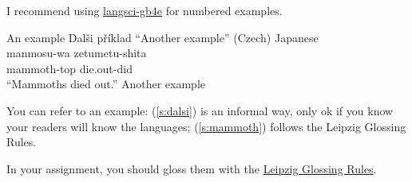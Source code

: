 \documentclass[12pt]{article}
\begin{document}
I recommend using  \href{https://ctan.math.utah.edu/ctan/tex-archive/macros/xetex/latex/langsci/documentation/langsci-gb4e.pdf}{langsci-gb4e} for numbered examples.

\begin{exe}
\ex An example
\ex Dalši příklad “Another example” (Czech) \label{s:dalsi}
\ex Japanese \label{s:mammoth}   \\
    \gll manmosu-wa zetumetu-shita \\
         mammoth-{\sc top} die.out-did \\
    \trans “Mammoths died out.” 
\ex Another example
\end{exe}

You can refer to an example: (\ref{s:dalsi}) is an informal way, only ok if you know your readers will know the languages;  (\ref{s:mammoth}) follows the Leipzig Glossing Rules.

In your assignment, you should gloss them with the \href{https://www.eva.mpg.de/lingua/pdf/Glossing-Rules.pdf}{Leipzig Glossing Rules}.
\end{document}
